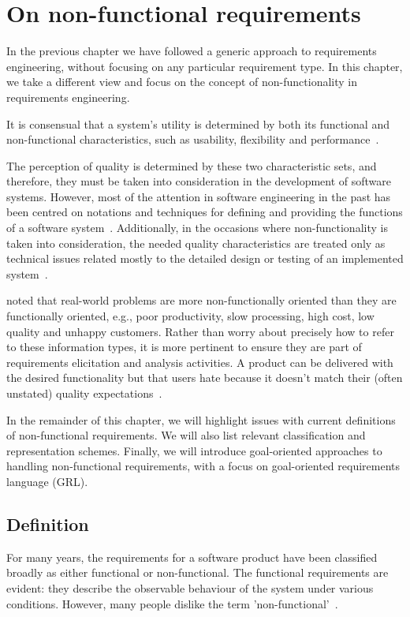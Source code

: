 \documentclass[dissertation,final]{softeng}
\begin{document}
\chapter{On non-functional requirements}
\label{ch:nfr_research}
In the previous chapter we have followed a generic approach to requirements engineering, without focusing on any particular requirement type. In this chapter, we take a different view and focus on the concept of non-functionality in requirements engineering.

It is consensual that a system's utility is determined by both its functional and non-functional characteristics, such as usability, flexibility and performance~\citep{Chung:2009vg}.

The perception of quality is determined by these two characteristic sets, and therefore, they must be taken into consideration in the development of software systems. However, most of the attention in software engineering in the past has been centred on notations and techniques for defining and providing the functions of a software system~\citep{Chung:2009vg}. Additionally, in the occasions where non-functionality is taken into consideration, the needed quality characteristics are treated only as technical issues related mostly to the detailed design or testing of an implemented system~\citep{Chung:2009vg}.

\citet{Chung:2009vg} noted that real-world problems are more non-functionally oriented than they are functionally oriented, e.g., poor productivity, slow processing, high cost, low quality and unhappy customers. Rather than worry about precisely how to refer to these information types, it is more pertinent to ensure they are part of requirements elicitation and analysis activities. A product can be delivered with the desired functionality but that users hate because it doesn't match their (often unstated) quality expectations~\citep{Wiegers2013}.

In the remainder of this chapter, we will highlight issues with current definitions of non-functional requirements. We will also list relevant classification and representation schemes. Finally, we will introduce goal-oriented approaches to handling non-functional requirements, with a focus on goal-oriented requirements language (GRL).

\section{Definition}
For many years, the requirements for a software product have been classified broadly as either functional or non-functional. The functional requirements are evident: they describe the observable behaviour of the system under various conditions. However, many people dislike the term 'non-functional'~\citep{Wiegers2013}. 
\end{document}
